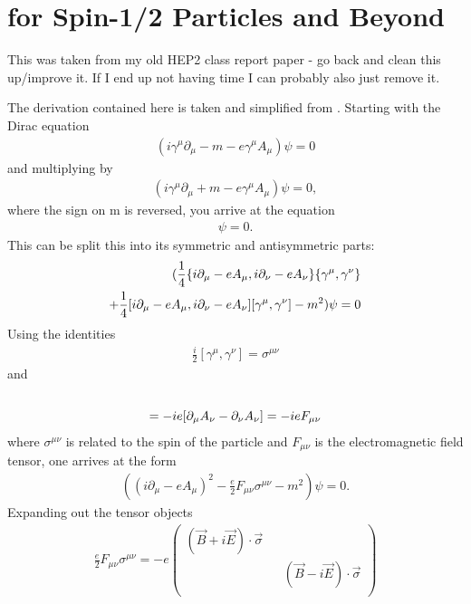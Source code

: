 
\thispagestyle{myheadings}

\chapter{\g for Spin-1/2 Particles and Beyond}
\label{gDirac}

This was taken from my old HEP2 class report paper - go back and clean this up/improve it. If I end up not having time I can probably also just remove it.

The derivation contained here is taken and simplified from . Starting with the Dirac equation 
\begin{align}
(i\gamma^{\mu}\partial_{\mu} - m -e \gamma^{\mu}A_{\mu})\psi = 0
\end{align}
and multiplying by 
\begin{align}
(i\gamma^{\mu}\partial_{\mu} + m -e \gamma^{\mu}A_{\mu})\psi = 0,
\end{align}
where the sign on m is reversed, you arrive at the equation
\begin{align}
[(i\partial_{\mu}-eA_{\mu})(i\partial_{\nu}-eA_{\nu})\gamma^{\mu}\gamma^{\nu} - m^{2}]\psi = 0.
\end{align}
This can be split this into its symmetric and antisymmetric parts:
\begin{align}
(\frac{1}{4}\{i\partial_{\mu}-eA_{\mu},i\partial_{\nu}-eA_{\nu}\}\{\gamma^{\mu}, \gamma^{\nu}\} \notag \\
+\frac{1}{4}[i\partial_{\mu}-eA_{\mu},i\partial_{\nu}-eA_{\nu}][\gamma^{\mu}, \gamma^{\nu}] - m^{2})\psi = 0
\end{align}
Using the identities 
\begin{align}
\frac{i}{2}[\gamma^{\mu}, \gamma^{\nu}] = \sigma^{\mu\nu}
\end{align}
and
\begin{align}
[i\partial_{\mu}-eA_{\mu},i\partial_{\nu}-eA_{\nu}] \notag \\
= -ie[\partial_{\mu}A_{\nu} - \partial_{\nu}A_{\nu}] = -ie F_{\mu\nu}
\end{align}
where $\sigma^{\mu\nu}$ is related to the spin of the particle and $F_{\mu\nu}$ is the electromagnetic field tensor, one arrives at the form
\begin{align}
((i\partial_{\mu}-eA_{\mu})^{2} - \frac{e}{2} F_{\mu\nu}\sigma^{\mu\nu} - m^{2})\psi = 0.
\end{align}
Expanding out the tensor objects
\begin{align}
\frac{e}{2} F_{\mu\nu}\sigma^{\mu\nu} = -e
\begin{pmatrix}
(\vec{B} + i \vec{E})\cdot \vec{\sigma} && \\
&& (\vec{B} - i \vec{E})\cdot \vec{\sigma} \\
\end{pmatrix}
\end{align}
